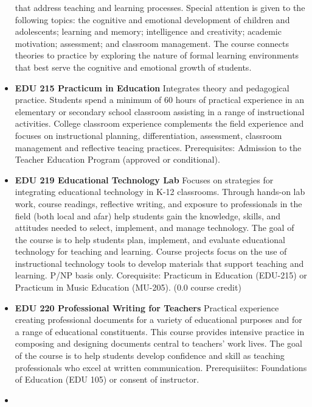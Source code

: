 \documentclass[
  letterpaper,
]{scrbook}
\begin{document}
\begin{itemize}
  that address teaching and learning processes. Special attention is
  given to the following topics: the cognitive and emotional development
  of children and adolescents; learning and memory; intelligence and
  creativity; academic motivation; assessment; and classroom management.
  The course connects theories to practice by exploring the nature of
  formal learning environments that best serve the cognitive and
  emotional growth of students.\\
\item
  \textbf{EDU 215 Practicum in Education} Integrates theory and
  pedagogical practice. Students spend a minimum of 60 hours of
  practical experience in an elementary or secondary school classroom
  assisting in a range of instructional activities. College classroom
  experience complements the field experience and focuses on
  instructional planning, differentiation, assessment, classroom
  management and reflective teacing practices. Prerequisites: Admission
  to the Teacher Education Program (approved or conditional).\\
\item
  \textbf{EDU 219 Educational Technology Lab} Focuses on strategies for
  integrating educational technology in K-12 classrooms. Through
  hands-on lab work, course readings, reflective writing, and exposure
  to professionals in the field (both local and afar) help students gain
  the knowledge, skills, and attitudes needed to select, implement, and
  manage technology. The goal of the course is to help students plan,
  implement, and evaluate educational technology for teaching and
  learning. Course projects focus on the use of instructional technology
  tools to develop materials that support teaching and learning. P/NP
  basis only. Corequisite: Practicum in Education (EDU-215) or Practicum
  in Music Education (MU-205). (0.0 course credit)\\
\item
  \textbf{EDU 220 Professional Writing for Teachers} Practical
  experience creating professional documents for a variety of
  educational purposes and for a range of educational constituents. This
  course provides intensive practice in composing and designing
  documents central to teachers' work lives. The goal of the course is
  to help students develop confidence and skill as teaching
  professionals who excel at written communication. Prerequisiites:
  Foundations of Education (EDU 105) or consent of instructor.\\
\item

\end{itemize}
\end{document}
